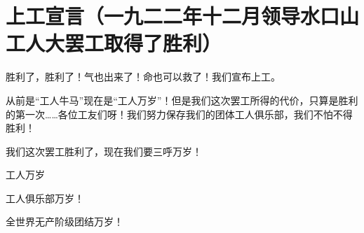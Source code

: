 \section{上工宣言（一九二二年十二月领导水口山工人大罢工取得了胜利）}


胜利了，胜利了！气也出来了！命也可以救了！我们宣布上工。

从前是“工人牛马”现在是“工人万岁”！但是我们这次罢工所得的代价，只算是胜利的第一次……各位工友们呀！我们努力保存我们的团体工人俱乐部，我们不怕不得胜利！

我们这次罢工胜利了，现在我们要三呼万岁！

工人万岁

工人俱乐部万岁！

全世界无产阶级团结万岁！

